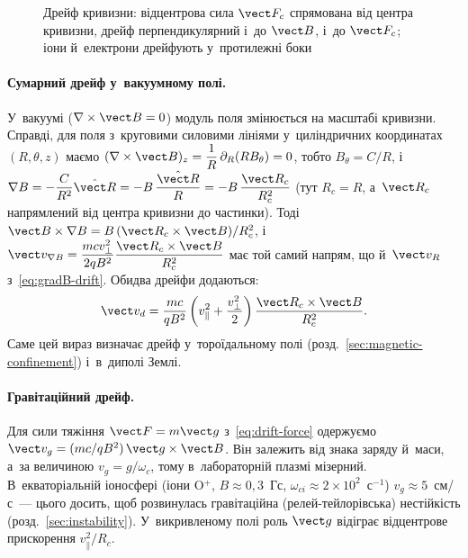 \begin{figure}[h!]\centering
	\caption{Дрейф кривизни: відцентрова сила $\vect F_c$ спрямована від центра кривизни,
	дрейф перпендикулярний і~до $\vect B$, і~до $\vect F_c$; іони й~електрони дрейфують
	у~протилежні боки}
	\label{pic:curvature-drift}
\end{figure}

\paragraph{Сумарний дрейф у~вакуумному полі.}
У~вакуумі ($\nabla\times\vect B=0$) модуль поля змінюється на масштабі кривизни.
Справді, для поля з~круговими силовими лініями у~циліндричних координатах $(R,\theta,z)$ маємо
$(\nabla\times\vect B)_z=\dfrac1R\,\partial_R(RB_\theta)=0$, тобто $B_\theta=C/R$, і~
$\nabla B=-\dfrac{C}{R^2}\hat{\vect R}=-B\,\dfrac{\hat{\vect R}}{R}=-B\,\dfrac{\vect R_c}{R_c^2}$
(тут $R_c=R$, а~$\vect R_c$ напрямлений від центра кривизни до частинки). Тоді
$\vect B\times\nabla B=B\,(\vect R_c\times\vect B)/R_c^2$, і~$\vect v_{\nabla B}=\dfrac{mcv_\perp^2}{2qB^2}\dfrac{\vect R_c\times\vect B}{R_c^2}$
має той самий напрям, що й~$\vect v_R$ з~\eqref{eq:gradB-drift}. Обидва дрейфи додаються:
\begin{equation}\label{eq:total-drift}
	\vect v_d=\frac{mc}{qB^2}\left(v_\parallel^2+\frac{v_\perp^2}2\right)\frac{\vect R_c\times\vect B}{R_c^2}.
\end{equation}
Саме цей вираз визначає дрейф у~тороїдальному полі (розд.~\ref{sec:magnetic-confinement}) і~в~диполі Землі.

\paragraph{Гравітаційний дрейф.}
Для сили тяжіння $\vect F=m\vect g$ з~\eqref{eq:drift-force} одержуємо
$\vect v_g=(mc/qB^2)\,\vect g\times\vect B$. Він залежить від знака заряду й~маси, а~за величиною $v_g=g/\omega_c$, тому в~лабораторній
плазмі мізерний. В~екваторіальній іоносфері (іони O$^+$, $B\approx0{,}3$~Гс, $\omega_{ci}\approx2\times10^2$~с$^{-1}$)
$v_g\approx5$~см/с~--- цього досить, щоб розвинулась гравітаційна (релей-тейлорівська) нестійкість
(розд.~\ref{sec:instability}). У~викривленому полі роль $\vect g$ відіграє відцентрове прискорення $v_\parallel^2/R_c$.

